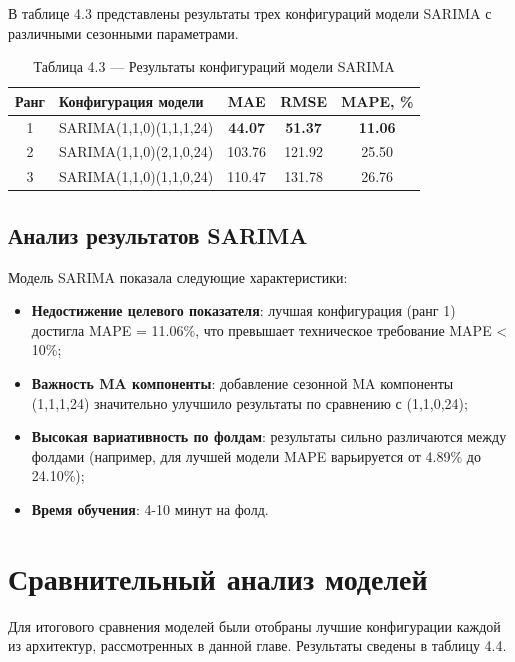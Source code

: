 В таблице 4.3 представлены результаты трех конфигураций модели SARIMA с различными сезонными параметрами.

\begin{table}[H]
	\centering
	\caption*{Таблица 4.3 --- Результаты конфигураций модели SARIMA}
	\begin{tabular}{|c|p{8cm}|c|c|c|}
		\hline
		\textbf{Ранг} & \textbf{Конфигурация модели} & \textbf{MAE} & \textbf{RMSE} & \textbf{MAPE, \%} \\
		\hline
		1 & SARIMA(1,1,0)(1,1,1,24) & \textbf{44.07} & \textbf{51.37} & \textbf{11.06} \\
		\hline
		2 & SARIMA(1,1,0)(2,1,0,24) & 103.76 & 121.92 & 25.50 \\
		\hline
		3 & SARIMA(1,1,0)(1,1,0,24) & 110.47 & 131.78 & 26.76 \\
		\hline
	\end{tabular}
	\label{tab:sarima_results}
\end{table}

\subsection{Анализ результатов SARIMA}

Модель SARIMA показала следующие характеристики:

\begin{itemize}
	\item \textbf{Недостижение целевого показателя}: лучшая конфигурация (ранг 1) достигла MAPE = 11.06\%, что превышает техническое требование MAPE < 10\%;
	\item \textbf{Важность MA компоненты}: добавление сезонной MA компоненты (1,1,1,24) значительно улучшило результаты по сравнению с (1,1,0,24);
	\item \textbf{Высокая вариативность по фолдам}: результаты сильно различаются между фолдами (например, для лучшей модели MAPE варьируется от 4.89\% до 24.10\%);
	\item \textbf{Время обучения}: 4-10 минут на фолд.
\end{itemize}

\section{Сравнительный анализ моделей}
\label{sec:model_comparison}

Для итогового сравнения моделей были отобраны лучшие конфигурации каждой из архитектур, рассмотренных в данной главе. Результаты сведены в таблицу 4.4.

